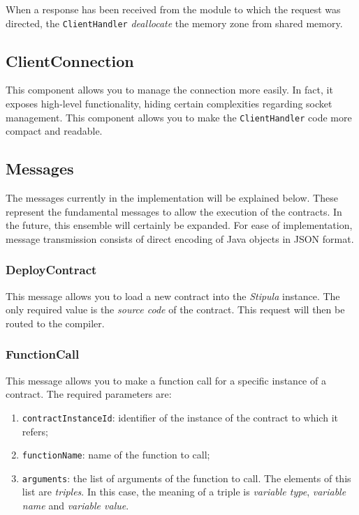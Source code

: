 When a response has been received from the module to which the request was directed, the 
\verb|ClientHandler| \textit{deallocate} the memory zone from shared memory.

\subsection{ClientConnection}

This component allows you to manage the connection more easily. In fact, it exposes high-level 
functionality, hiding certain complexities regarding socket management. This component allows you to make 
the \verb|ClientHandler| code more compact and readable.

\subsection{Messages}
\label{messages}

The messages currently in the implementation will be explained below. These represent the fundamental 
messages to allow the execution of the contracts. In the future, this ensemble will certainly be expanded. 
For ease of implementation, message transmission consists of direct encoding of Java objects in JSON 
format.

\subsubsection{DeployContract}
\label{deploy-contract}

This message allows you to load a new contract into the \textit{Stipula} instance. The only required value 
is the \textit{source code} of the contract. This request will then be routed to the compiler.

\subsubsection{FunctionCall}
\label{function-call-message}

This message allows you to make a function call for a specific instance of a contract. The required 
parameters are:
\begin{enumerate}
   \item \verb|contractInstanceId|: identifier of the instance of the contract to which it refers;
   \item \verb|functionName|: name of the function to call;
   \item \verb|arguments|: the list of arguments of the function to call. The elements of this list are 
   \textit{triples}. In this case, the meaning of a triple is \textit{variable type}, 
   \textit{variable name} and \textit{variable value}.
\end{enumerate}

